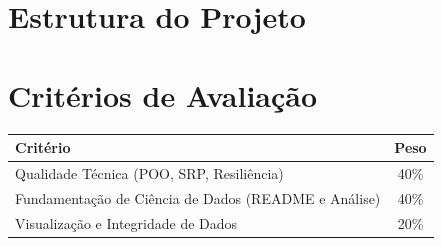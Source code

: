 \documentclass[12pt,a4paper]{article}
\begin{document}
	\section{Estrutura do Projeto}
	\begin{minipage}{\textwidth}
	\end{minipage}

	\section{Critérios de Avaliação}
	\begin{center}
		\begin{tabular}{lc}
			\toprule
			\textbf{Critério} & \textbf{Peso} \\
			\midrule
			Qualidade Técnica (POO, SRP, Resiliência) & 40\% \\
			Fundamentação de Ciência de Dados (README e Análise) & 40\% \\
			Visualização e Integridade de Dados & 20\% \\
			\bottomrule
		\end{tabular}
	\end{center}
\end{document}

